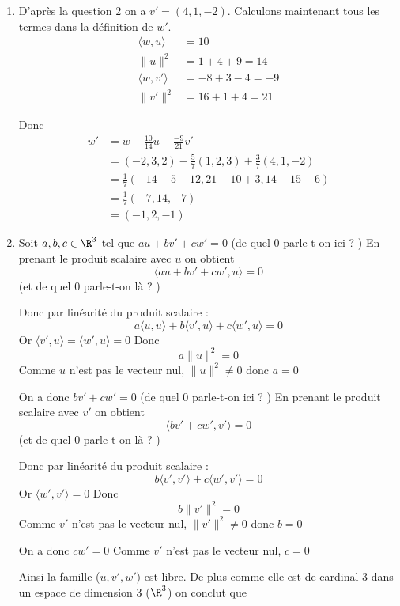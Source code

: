 \documentclass[a4paper, 11pt,reqno]{article}
\begin{document}
\begin{correction}
\begin{enumerate}
\begin{enumerate}
\item D'après la question 2 on a $v'= (4,1,-2)$. Calculons maintenant tous les termes dans la définition de $w'$. 
\begin{align*}
\langle w , u \rangle&= 10\\
\|u\|^2 &= 1+4+9=14\\
\langle w , v' \rangle&= -8+3-4=-9\\
\|v'\|^2 &= 16+1+4=21
\end{align*}

Donc 
\begin{align*}
w' & =w - \frac{10}{14} u - \frac{-9}{21}v'\\
	&= (-2,3,2) - \frac{5}{7} (1,2,3) +\frac{3}{7} (4,1,-2)\\
	&= \frac{1}{7} (-14-5+12, 21-10 +3, 14-15-6)\\
	&=\frac{1}{7} (-7, 14, -7)\\
	&= (-1,2,-1)
\end{align*}

\item 
Soit $a,b,c\in \R^3$ tel que $au+bv'+cw'=0$  (de quel 0 parle-t-on ici ? )
En prenant le produit scalaire avec $u$ on obtient 
$$\langle au+bv'+cw', u \rangle = 0$$
 (et de quel 0 parle-t-on là ? )
 
 Donc par linéarité du produit scalaire : 
 $$a \langle u, u \rangle+b\langle v', u \rangle+c\langle w', u \rangle=0$$
Or $\langle v', u \rangle= \langle w', u \rangle=0$
Donc  $$a \|u\|^2=0$$
Comme $u$ n'est pas le vecteur nul, $\|u\|^2 \neq 0$ donc $a=0$ 

On a donc $bv'+cw'=0$  (de quel 0 parle-t-on ici ? )
En prenant le produit scalaire avec $v'$ on obtient 
$$\langle bv'+cw', v' \rangle = 0$$
 (et de quel 0 parle-t-on là ? )
 
 Donc par linéarité du produit scalaire : 
 $$b\langle v', v'\rangle+c\langle w', v' \rangle=0$$
Or $\langle w', v' \rangle=0$
Donc  $$b\|v'\|^2=0$$
Comme $v'$ n'est pas le vecteur nul, $\|v'\|^2 \neq 0$ donc $b=0$ 

On a donc $cw'=0$
Comme $v'$ n'est pas le vecteur nul, $c=0$ 

Ainsi la famille ($u,v',w') $ est libre. De plus comme elle est de cardinal 3 dans un espace de dimension 3 ($\R^3$)  on conclut que 











\end{enumerate}


\end{enumerate}
\end{correction}
\end{document}
